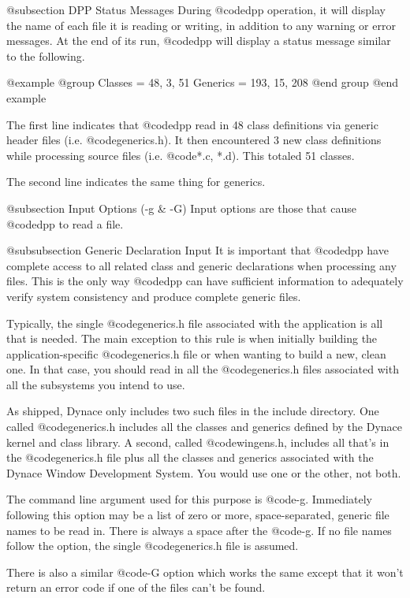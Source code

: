 @subsection DPP Status Messages
During @code{dpp} operation, it will display the name of each file
it is reading or writing, in addition to any warning or error messages.
At the end of its run, @code{dpp} will display a status message similar
to the following.

@example
@group
Classes  = 48, 3, 51
Generics = 193, 15, 208
@end group
@end example

The first line indicates that @code{dpp} read in 48 class definitions
via generic header files (i.e. @code{generics.h}).  It then encountered
3 new class definitions while processing source files
(i.e. @code{*.c, *.d}).  This totaled 51 classes.

The second line indicates the same thing for generics.


@subsection Input Options (-g & -G)
Input options are those that cause @code{dpp} to read a file.

@subsubsection Generic Declaration Input
It is important that @code{dpp} have complete access to all related
class and generic declarations when processing any files.  This is
the only way @code{dpp} can have sufficient information to adequately
verify system consistency and produce complete generic files.

Typically, the single @code{generics.h} file associated with the application
is all that is needed.  The main exception to this rule is when initially
building the application-specific @code{generics.h} file or when wanting
to build a new, clean one.  In that case, you should read in all the
@code{generics.h} files associated with all the subsystems you intend
to use.

As shipped, Dynace only includes two such files in the include directory.
One called @code{generics.h} includes all the classes and generics
defined by the Dynace kernel and class library.  A second, called
@code{wingens.h}, includes all that's in the @code{generics.h} file plus
all the classes and generics associated with the Dynace Window
Development System.  You would use one or the other, not both.

The command line argument used for this purpose is @code{-g}.
Immediately following this option may be a list of zero or more,
space-separated, generic file names to be read in.  There is always
a space after the @code{-g}.  If no file names follow the option,
the single @code{generics.h} file is assumed.

There is also a similar @code{-G} option which works the same except
that it won't return an error code if one of the files can't be
found.

